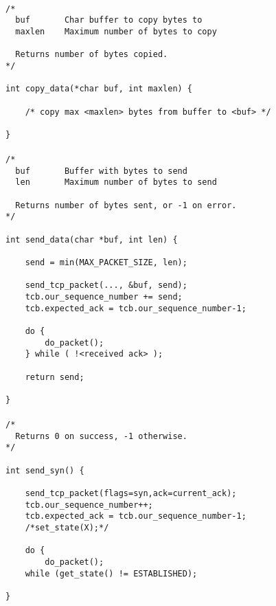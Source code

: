 \documentclass[11pt]{article}
\begin{document}
\paragraph{}


\begin{lstlisting}[title=Procedure copy\_data]
/*
  buf       Char buffer to copy bytes to
  maxlen    Maximum number of bytes to copy

  Returns number of bytes copied.
*/

int copy_data(*char buf, int maxlen) {

    /* copy max <maxlen> bytes from buffer to <buf> */

}
\end{lstlisting}


\paragraph{}


\begin{lstlisting}[title=Procedure send\_data]
/*
  buf       Buffer with bytes to send
  len       Maximum number of bytes to send

  Returns number of bytes sent, or -1 on error.
*/

int send_data(char *buf, int len) {

    send = min(MAX_PACKET_SIZE, len);

    send_tcp_packet(..., &buf, send);
    tcb.our_sequence_number += send;
    tcb.expected_ack = tcb.our_sequence_number-1;

    do {
        do_packet();
    } while ( !<received ack> );

    return send;

}
\end{lstlisting}


\paragraph{}


\begin{lstlisting}[title=Procedure send\_syn]
/*
  Returns 0 on success, -1 otherwise.
*/

int send_syn() {

    send_tcp_packet(flags=syn,ack=current_ack);
    tcb.our_sequence_number++;
    tcb.expected_ack = tcb.our_sequence_number-1;
    /*set_state(X);*/

    do {
        do_packet();
    while (get_state() != ESTABLISHED);

}
\end{lstlisting}
\end{document}
